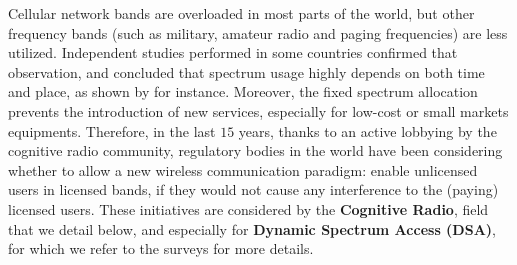Cellular network bands are overloaded in most parts of the world, but other frequency bands (such as military, amateur radio and paging frequencies) are less utilized.
Independent studies performed in some countries confirmed that observation, and concluded that spectrum usage highly depends on both time and place, as shown by \cite{Lopez2009spectral} for instance.
Moreover, the fixed spectrum allocation prevents
the introduction of new services, especially for low-cost or small markets equipments.
Therefore, in the last $15$ years, thanks to an active lobbying by the cognitive radio community,
regulatory bodies in the world have been considering whether to allow
a new wireless communication paradigm:
enable unlicensed users in licensed bands, if they would not cause any interference to the (paying) licensed users.
These initiatives are considered by the \textbf{Cognitive Radio},
field that we detail below, and especially for \textbf{Dynamic Spectrum Access (DSA)},
for which we refer to the surveys \cite{akyildiz2006next,garhwal2012survey} for more details.


